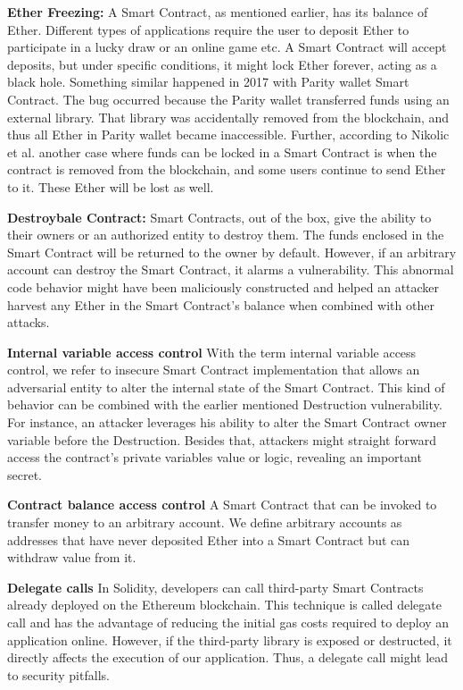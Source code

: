 \documentclass[a4paper,11pt]{article}
\begin{document}

\textbf{Ether Freezing:}
A Smart Contract, as mentioned earlier, has its balance of Ether. Different
types of applications require the user to deposit Ether to participate in a
lucky draw or an online game etc. A Smart Contract will accept deposits, but
under specific conditions, it might lock Ether forever, acting as a black hole.
Something similar happened in 2017 with Parity wallet Smart Contract. The bug
occurred because the Parity wallet transferred funds using an external library.
That library was accidentally removed from the blockchain, and thus all Ether in
Parity wallet became inaccessible. Further, according to Nikolic et al. another
case where funds can be locked in a Smart Contract is when the contract is
removed from the blockchain, and some users continue to send Ether to it. These
Ether will be lost as well.

\textbf{Destroybale Contract:}
Smart Contracts, out of the box, give the ability to their owners or an
authorized entity to destroy them. The funds enclosed in the Smart Contract will
be returned to the owner by default. However, if an arbitrary account can
destroy the Smart Contract, it alarms a vulnerability. This abnormal code
behavior might have been maliciously constructed and helped an attacker harvest
any Ether in the Smart Contract's balance when combined with other attacks.

\textbf{Internal variable access control}
With the term internal variable access control, we refer to insecure Smart
Contract implementation that allows an adversarial entity to alter the internal
state of the Smart Contract. This kind of behavior can be combined with the
earlier mentioned Destruction vulnerability. For instance, an attacker leverages
his ability to alter the Smart Contract owner variable before the Destruction.
Besides that, attackers might straight forward access the contract's private
variables value or logic, revealing an important secret. 

\textbf{Contract balance access control}
A Smart Contract that can be invoked to transfer money to an arbitrary account.
We define arbitrary accounts as addresses that have never deposited Ether into a
Smart Contract but can withdraw value from it. 

\textbf{Delegate calls}
In Solidity, developers can call third-party Smart Contracts already deployed on
the Ethereum blockchain. This technique is called delegate call and has the
advantage of reducing the initial gas costs required to deploy an application
online. However, if the third-party library is exposed or destructed, it
directly affects the execution of our application. Thus, a delegate call might
lead to security pitfalls.
\end{document}
